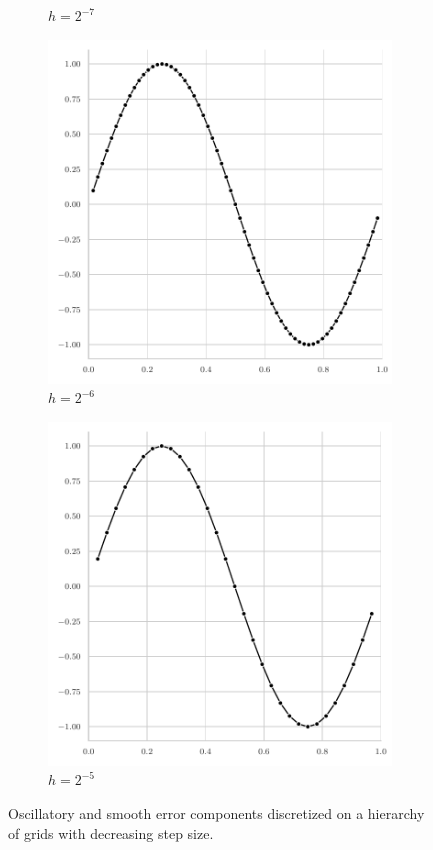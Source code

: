 \begin{figure}
\begin{subfigure}[b]{0.32\textwidth}
		\caption{$h = 2^{-7}$}
	\end{subfigure}
	\hfill
	\begin{subfigure}[b]{0.32\textwidth}
		\centering
		\includegraphics[width=\textwidth]{figures/error_plots//initial_error_2pi_level6.pdf}
		\caption{$h = 2^{-6}$}
	\end{subfigure}
	\hfill
	\begin{subfigure}[b]{0.32\textwidth}
		\centering
		\includegraphics[width=\textwidth]{figures/error_plots//initial_error_2pi_level5.pdf}
		\caption{$h = 2^{-5}$}
	\end{subfigure}
	\caption{Oscillatory and smooth error components discretized on a hierarchy of grids with decreasing step size.}
	\label{fig:error-on-multiple-levels}
\end{figure}
